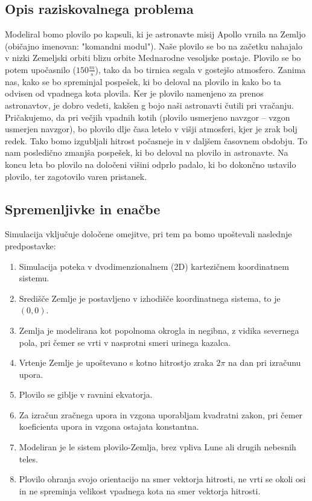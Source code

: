 \documentclass[a4paper,12pt]{article}
\begin{document}
    \subsection{Opis raziskovalnega problema}
    Modeliral bomo plovilo po kapsuli, ki je astronavte misij Apollo vrnila na Zemljo (običajno imenovan: "komandni modul").
    Naše plovilo se bo na začetku nahajalo v nizki Zemeljski orbiti blizu orbite Mednarodne vesoljske postaje.
    Plovilo se bo potem upočasnilo ($150 \frac{m}{s}$), tako da bo tirnica segala v gostejšo atmosfero.
    Zanima nas, kako se bo spreminjal pospešek, ki bo deloval na plovilo in kako bo ta odvisen od vpadnega kota plovila.
    Ker je plovilo namenjeno za prenos astronavtov, je dobro vedeti, kakšen g bojo naši astronavti čutili pri vračanju.
    Pričakujemo, da pri večjih vpadnih kotih (plovilo usmerjeno navzgor – vzgon usmerjen navzgor), bo plovilo dlje časa letelo v višji atmosferi, kjer je zrak bolj redek.
    Tako bomo izgubljali hitrost počasneje in v daljšem časovnem obdobju.
    To nam posledično zmanjša pospešek, ki bo deloval na plovilo in astronavte.
    Na koncu leta bo plovilo na določeni višini odprlo padalo, ki bo dokončno ustavilo plovilo, ter zagotovilo varen pristanek.

    \subsection{Spremenljivke in enačbe}
    Simulacija vključuje določene omejitve, pri tem pa bomo upoštevali naslednje predpostavke:
    \begin{enumerate}
        \item Simulacija poteka v dvodimenzionalnem (2D) kartezičnem koordinatnem sistemu.
        \item Središče Zemlje je postavljeno v izhodišče koordinatnega sistema, to je $(0, 0)$.
        \item Zemlja je modelirana kot popolnoma okrogla in negibna, z vidika severnega pola, pri čemer se vrti v nasprotni smeri urinega kazalca.
        \item Vrtenje Zemlje je upoštevano s kotno hitrostjo zraka $2\pi$ na dan pri izračunu upora.
        \item Plovilo se giblje v ravnini ekvatorja.
        \item Za izračun zračnega upora in vzgona uporabljam kvadratni zakon, pri čemer koeficienta upora in vzgona ostajata konstantna.
        \item Modeliran je le sistem plovilo-Zemlja, brez vpliva Lune ali drugih nebesnih teles.
        \item Plovilo ohranja svojo orientacijo na smer vektorja hitrosti, ne vrti se okoli osi in ne spreminja velikost vpadnega kota na smer vektorja hitrosti.
    \end{enumerate}
\end{document}
